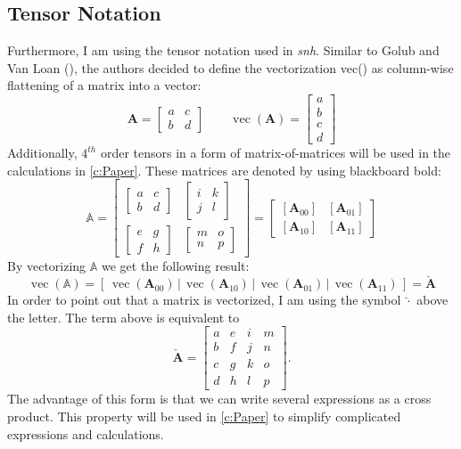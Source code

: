 \subsection{Tensor Notation}
Furthermore, I am using the tensor notation used in \textit{\acrshort{snh}}. Similar to Golub and Van Loan (\cite{golub2012matrix}), the authors decided to define the vectorization vec(\cdot) as column-wise flattening of a matrix into a vector:
\[
\mathbf{A} = \begin{bmatrix} a & c \\ b & d \end{bmatrix} \qquad \operatorname{vec}(\mathbf{A}) = \begin{bmatrix} a \\ b \\ c \\ d \end{bmatrix}
\]
Additionally, $4^{th}$ order tensors in a form of matrix-of-matrices will be used in the calculations in \autoref{c:Paper}. These matrices are denoted by using blackboard bold:
\[
\mathbb{A} = 
\left[\begin{array}{cc}{\begin{bmatrix} a & c \\ b & d \end{bmatrix}} & {\begin{bmatrix} i & k \\ j & l \end{bmatrix}} \\ {\begin{bmatrix} e & g \\ f & h \end{bmatrix}} & {\begin{bmatrix} m & o \\ n & p \end{bmatrix}}\end{array}\right]
=
\left[\begin{array}{cc}{\left[\mathbf{A}_{00}\right]} & {\left[\mathbf{A}_{01}\right]} \\ {\left[\mathbf{A}_{10}\right]} & {\left[\mathbf{A}_{11}\right]}\end{array}\right]
\]
By vectorizing $\mathbb{A}$ we get the following result:
\[
\operatorname{vec}(\mathbb{A}) = \left[ \,\operatorname{vec}\left(\mathbf{A}_{00}\right)\, \bigg| \,\operatorname{vec}\left(\mathbf{A}_{10}\right)\, \bigg| \,\operatorname{vec}\left(\mathbf{A}_{01}\right)\, \bigg| \,\operatorname{vec}\left(\mathbf{A}_{11}\right)\, \right] = \mathbf{\check{A}}
\]
In order to point out that a matrix is vectorized, I am using the symbol $\check{\cdot}$ above the letter. The term above is equivalent to
\[
\mathbf{\check{A}}=\left[\begin{array}{llll}{a} & {e} & {i} & {m} \\ {b} & {f} & {j} & {n} \\ {c} & {g} & {k} & {o} \\ {d} & {h} & {l} & {p}\end{array}\right].
\]
The advantage of this form is that we can write several expressions as a cross product. This property will be used in \autoref{c:Paper} to simplify complicated expressions and calculations.

